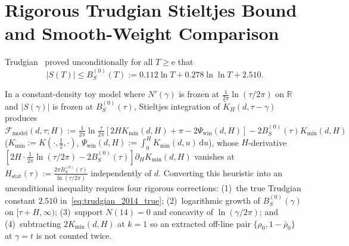 \documentclass[11pt,reqno]{amsart}
\theoremstyle{definition}
\theoremstyle{remark}
\numberwithin{equation}{section}
\newcommand{\R}{\mathbb{R}}
\newcommand{\dd}{\mathrm{d}}
\newcommand{\ee}{\mathrm{e}}
\begin{document}
\section{Rigorous Trudgian Stieltjes Bound and Smooth-Weight Comparison}\label{sec:trudgian}

Trudgian~\cite[Thm.~1]{trudgian2014} proved unconditionally for all $T \ge \ee$ that
\begin{equation}\label{eq:trudgian_2014_true}
\lvert S(T)\rvert \le B_S^{(0)}(T) := 0.112\ln T + 0.278\ln\ln T + 2.510.
\end{equation}
{\sloppy
In a constant-density toy model where $N'(\gamma)$ is frozen at $\frac{1}{2\pi}\ln(\tau/2\pi)$ on $\R$ and $\lvert S(\gamma)\rvert$ is frozen at $B_S^{(0)}(\tau)$, Stieltjes integration of $\widetilde{K}_H(d, \tau - \gamma)$ produces $\mathcal{F}_{\mathrm{model}}(d, \tau; H) := \frac{1}{2\pi}\ln\frac{\tau}{2\pi}[2HK_{\min}(d,H) + \pi - 2\Psi_{\mathrm{win}}(d,H)] - 2B_S^{(0)}(\tau)K_{\min}(d,H)$ ($K_{\min} := K(\cdot, \frac{1}{2}, \cdot)$, $\Psi_{\mathrm{win}}(d,H) := \int_0^H K_{\min}(d,u)\,\dd u$), whose $H$-derivative $[2H \cdot \frac{1}{2\pi}\ln(\tau/2\pi) - 2B_S^{(0)}(\tau)]\partial_H K_{\min}(d,H)$ vanishes at $H_{\mathrm{stat}}(\tau) := \frac{2\pi B_S^{(0)}(\tau)}{\ln(\tau/2\pi)}$ independently of $d$. Converting this heuristic into an unconditional inequality requires four rigorous corrections: (1)~the true Trudgian constant $2.510$ in~\eqref{eq:trudgian_2014_true}; (2)~logarithmic growth of $B_S^{(0)}(\gamma)$ on $[\tau+H, \infty)$; (3)~support $N(14) = 0$ and concavity of $\ln(\gamma/2\pi)$; and (4)~subtracting $2K_{\min}(d,H)$ at $k = 1$ so an extracted off-line pair $\{\rho_0, 1 - \bar{\rho}_0\}$ at $\gamma = t$ is not counted twice.\par}
\end{document}
